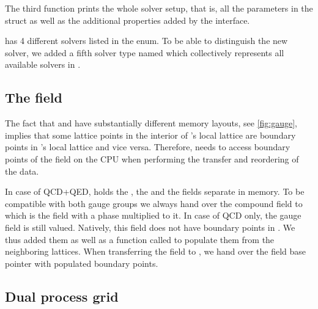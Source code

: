 The third function prints the whole solver setup, that is, all the parameters in the  struct as well as the additional properties added by the interface.

\Openqxd has \num{4} different solvers listed in the  enum. To be able to distinguish the new solver, we added a fifth solver type named  which collectively represents all available solvers in \quda.

\subsection{The  field}

The fact that \openqxd and \quda have substantially different memory layouts, see \cref{fig:gauge}, implies that some lattice points in the interior of \quda's local lattice are boundary points in \openqxd's local lattice and vice versa.
Therefore, \quda needs to access boundary points of the field on the CPU when performing the transfer and reordering of the data.

In case of QCD+QED, \openqxd holds the , the  and the  fields separate in memory.
To be compatible with both gauge groups we always hand over the compound  field to \quda which is the  field with a  phase multiplied to it.
In case of QCD only, the  gauge field is still  valued.
Natively, this field does not have boundary points in \openqxd.
We thus added them as well as a function called  to populate them from the neighboring lattices.
When transferring the field to \quda, we hand over the  field base pointer with populated boundary points.


\subsection{Dual process grid}
\label{sec:interface:openqxd:dual}


